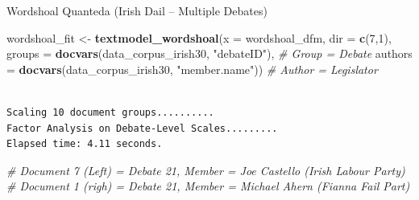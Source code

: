 \documentclass[
  ignorenonframetext,
  aspectratio=169]{beamer}
\newenvironment{Shaded}{\begin{snugshade}}{\end{snugshade}}
\newcommand{\AttributeTok}[1]{\textcolor[rgb]{0.13,0.29,0.53}{#1}}
\newcommand{\CommentTok}[1]{\textcolor[rgb]{0.56,0.35,0.01}{\textit{#1}}}
\newcommand{\DecValTok}[1]{\textcolor[rgb]{0.00,0.00,0.81}{#1}}
\newcommand{\FunctionTok}[1]{\textcolor[rgb]{0.13,0.29,0.53}{\textbf{#1}}}
\newcommand{\NormalTok}[1]{#1}
\newcommand{\OtherTok}[1]{\textcolor[rgb]{0.56,0.35,0.01}{#1}}
\newcommand{\StringTok}[1]{\textcolor[rgb]{0.31,0.60,0.02}{#1}}
\begin{document}
\begin{frame}[fragile]{Wordshoal Quanteda (Irish Dail -- Multiple
Debates)}
\begin{Shaded}
\begin{Highlighting}[]
\NormalTok{wordshoal\_fit }\OtherTok{\textless{}{-}} \FunctionTok{textmodel\_wordshoal}\NormalTok{(}\AttributeTok{x =}\NormalTok{ wordshoal\_dfm, }
                                                \AttributeTok{dir =} \FunctionTok{c}\NormalTok{(}\DecValTok{7}\NormalTok{,}\DecValTok{1}\NormalTok{),}
                                                \AttributeTok{groups =} \FunctionTok{docvars}\NormalTok{(data\_corpus\_irish30, }\StringTok{"debateID"}\NormalTok{), }\CommentTok{\# Group = Debate}
                                                \AttributeTok{authors =} \FunctionTok{docvars}\NormalTok{(data\_corpus\_irish30, }\StringTok{"member.name"}\NormalTok{)) }\CommentTok{\# Author = Legislator}
\end{Highlighting}
\end{Shaded}

\begin{verbatim}

Scaling 10 document groups..........
Factor Analysis on Debate-Level Scales.........
Elapsed time: 4.11 seconds.
\end{verbatim}

\begin{Shaded}
\begin{Highlighting}[]
\CommentTok{\# Document 7 (Left) = Debate 21, Member = Joe Castello (Irish Labour Party)}
\CommentTok{\# Document 1 (righ) = Debate 21, Member = Michael Ahern (Fianna Fail Part) }
\end{Highlighting}
\end{Shaded}
\end{frame}
\end{document}
